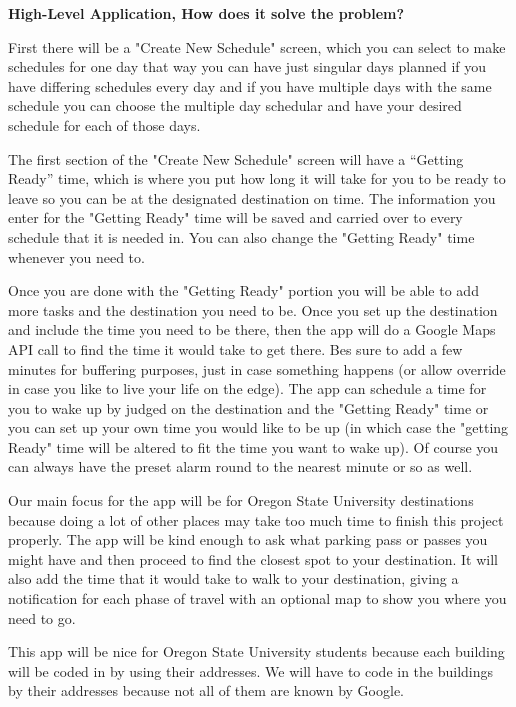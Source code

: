 \documentclass[12pt]{article}
\begin{document}
	
	\begin{flushleft}
		\textbf{High-Level Application, How does it solve the problem?}
	\end{flushleft}

	First there will be a "Create New Schedule" screen, which you can select to make schedules for one day that way you can have just singular days planned if you have differing schedules every day and if you have multiple days with the same schedule you can choose the multiple day schedular and have your desired schedule for each of those days. 

	The first section of the "Create New Schedule" screen will have a “Getting Ready” time, which is where you put how long it will take for you to be ready to leave so you can be at the designated destination on time.  The information you enter for the "Getting Ready" time will be saved and carried over to every schedule that it is needed in.  You can also change the "Getting Ready" time whenever you need to.
 
	Once you are done with the "Getting Ready" portion you will be able to add more tasks and the destination you need to be.  Once you set up the destination and include the time you need to be there, then the app will do a Google Maps API call to find the time it would take to get there.  Bes sure to add a few minutes for buffering purposes, just in case something happens (or allow override in case you like to live your life on the edge).  The app can schedule a time for you to wake up by judged on the destination and the "Getting Ready" time or you can set up your own time you would like to be up (in which case the "getting Ready" time will be altered to fit the time you want to wake up).  Of course you can always have the preset alarm round to the nearest minute or so as well.
  
	Our main focus for the app will be for Oregon State University destinations because doing a lot of other places may take too much time to finish this project properly.  The app will be kind enough to ask what parking pass or passes you might have and then proceed to find the closest spot to your destination.  It will also add the time that it would take to walk to your destination, giving a notification for each phase of travel with an optional map to show you where you need to go.

	This app will be nice for Oregon State University students because each building will be coded in by using their addresses.  We will have to code in the buildings by their addresses because not all of them are known by Google. \\
	
\end{document}
